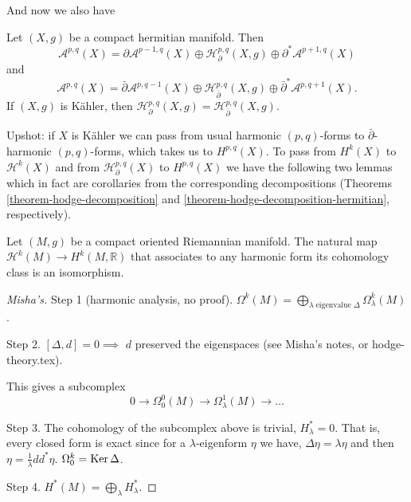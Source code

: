 \noindent
And now we also have
\begin{theorem}
\label{theorem-hodge-decomposition-hermitian}
Let $(X,g)$ be a compact hermitian manifold.
Then
$$
\mathcal{A}^{p,q}(X)=
\partial\mathcal{A}^{p-1,q}(X)
\oplus
\mathcal{H}^{p,q}_\partial(X,g)
\oplus
\partial^*\mathcal{A}^{p+1,q}(X)
$$
and
$$
\mathcal{A}^{p,q}(X)=
\bar\partial\mathcal{A}^{p,q-1}(X)
\oplus
\mathcal{H}^{p,q}_{\bar\partial}(X,g)
\oplus
\bar\partial^*\mathcal{A}^{p,q+1}(X).
$$
If $(X,g)$ is Kähler, then
$\mathcal{H}^{p,q}_\partial(X,g)=\mathcal{H}
^{p,q}_{\bar\partial}(X,g)$.
\end{theorem}

\noindent
Upshot: if $X$ is Kähler we can pass from
usual
harmonic $(p,q)$-forms to
$\bar\partial$-harmonic $(p,q)$-forms,
which takes us to $H^{p,q}(X)$.
To pass from $H^k(X)$ to $\mathcal{H}^k(X)$
and from
$\mathcal{H}^{p,q}_{\partial}(X)$ to
$H^{p,q}(X)$
we have the following two lemmas
which in fact are corollaries from the
corresponding decompositions
(Theorems \ref{theorem-hodge-decomposition}
and
\ref{theorem-hodge-decomposition-hermitian},
respectively).

\begin{corollary}
\label{lemma-de-rham-to-harmonic}
\begin{reference}
\cite[Corollary A.0.17]{huc}
\end{reference}
Let $(M,g)$ be a compact oriented Riemannian
manifold.
The natural map $\mathcal{H}^k(M) \to
H^k(M,\mathbb{R})$
that associates to any harmonic form its
cohomology class is
an isomorphism.
\end{corollary}

\begin{proof}[Misha's]
Step 1 (harmonic analysis, no proof).
$\Omega^k(M)=\bigoplus_{\lambda\operatorname{eigenvalue}\Delta}
\Omega_\lambda^k(M)$.

\noindent
Step 2. $[\Delta,d]=0 \implies $ $d$
preserved the eigenspaces (see Misha's
notes, or hodge-theory.tex).

This gives a subcomplex
$$
0 \to \Omega_0^0(M)
\to \Omega^1_\lambda(M)
\to …
$$

\noindent
Step 3. The cohomology of the subcomplex
above is trivial, $H^*_\lambda=0$. That is,
every closed form is exact since for a
$\lambda$-eigenform $\eta$ we have,
$\Delta \eta = \lambda \eta$ and then
$\eta = \frac{1}{\lambda}d d^*\eta$.
$\Omega_0^k = \mathop{\mathrm{Ker}} \Delta$.

\noindent
Step 4. $H^*(M) = \bigoplus_\lambda
H_\lambda ^*$.

\end{proof}

